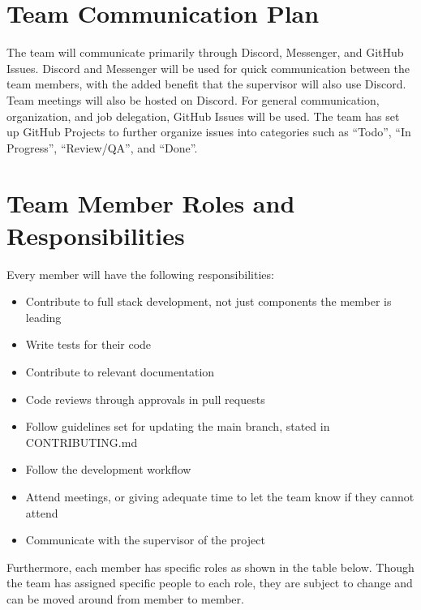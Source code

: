 \documentclass{article}
\begin{document}
\section{Team Communication Plan}

The team will communicate primarily through Discord, Messenger, and GitHub Issues. Discord 
and Messenger will be used for quick communication between the team members, with the added 
benefit that the supervisor will also use Discord. Team meetings will also be hosted on Discord. For 
general communication, organization, and job delegation, GitHub Issues will be used. The team has set up 
GitHub Projects to further organize issues into categories such as ``Todo'', ``In Progress'', 
``Review/QA'', and ``Done''.

\section{Team Member Roles and Responsibilities}

Every member will have the following responsibilities:

\begin{itemize}
	\item Contribute to full stack development, not just components the member is leading
	\item Write tests for their code
	\item Contribute to relevant documentation
	\item Code reviews through approvals in pull requests
	\item Follow guidelines set for updating the main branch, stated in CONTRIBUTING.md
	\item Follow the development workflow
	\item Attend meetings, or giving adequate time to let the team know if they cannot attend
	\item Communicate with the supervisor of the project
\end{itemize}

Furthermore, each member has specific roles as shown in the table below. Though the team has assigned 
specific people to each role, they are subject to change and can be moved around from member to 
member.
\end{document}
